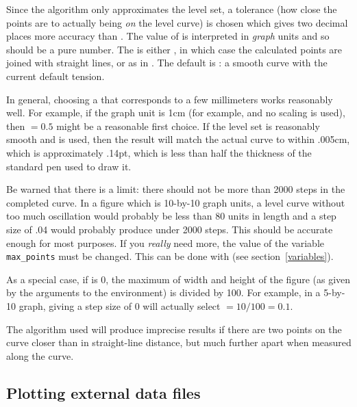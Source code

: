 \documentclass[letterpaper]{article}
\begin{document}
Since the algorithm only approximates the level set, a tolerance (how
close the points are to actually being \emph{on} the level curve) is
chosen which gives two decimal places more accuracy than .
The value of  is interpreted in \emph{graph} units and
so should be a pure number. The  is either ,
in which case the calculated points are joined with straight lines, or
 as in . The default is
: a smooth curve with the current default tension.

In general, choosing a  that corresponds to a few millimeters
works reasonably well. For example, if the graph unit is 1cm (for
example,  and no scaling is used), then
${}= 0.5$ might be a reasonable first choice. If the level
set is reasonably smooth and  is used, then the result will
match the actual curve to within .005cm, which is approximately .14pt,
which is less than half the thickness of the standard pen used to draw
it.

Be warned that there is a limit: there should not be more than 2000
steps in the completed curve. In a figure which is 10-by-10 graph units,
a level curve without too much oscillation would probably be less than
80 units in length and a step size of .04 would probably produce under
2000 steps. This should be accurate enough for most purposes. If you
\emph{really} need more, the value of the \MF{} variable
\verb$max_points$ must be changed. This can be done with
 (see section~\ref{variables}).

As a special case, if  is 0, the maximum of width and height
of the figure (as given by the arguments to the  environment)
is divided by 100. For example, in a 5-by-10 graph, giving a step size
of $0$ will actually select ${}= 10/100 = 0.1$.

The algorithm used will produce imprecise results if there are two
points on the curve closer than  in straight-line distance,
but much further apart when measured along the curve.

\subsection{Plotting external data files}\label{external}

\begin{cd}
\\
\\
%
%
%
\end{cd}
\end{document}

